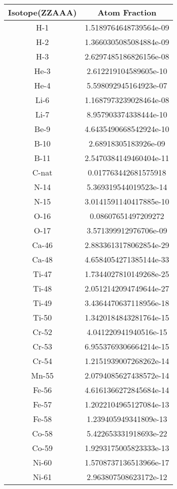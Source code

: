 \begin{table}[h!]
\centering
\begin{tabular}{|| c || c |}
\hline
Isotope(ZZAAA) & Atom Fraction \\
\hline \hline

H-1 &  1.5189764648739564e-09 \\
H-2 &  1.3660305085084884e-09 \\
H-3 &  2.6297485186826156e-08 \\
He-3 &  2.612219104589605e-10 \\
He-4 &  5.598092945164923e-07 \\
Li-6 &  1.1687973239028464e-08 \\
Li-7 &  8.957903374338444e-10 \\
Be-9 &  4.6435490668542924e-10 \\
B-10 &  2.68918305183926e-09 \\
B-11 &  2.5470384149460404e-11 \\
C-nat &  0.017763442681575918 \\
N-14 &  5.369319544019523e-14 \\
N-15 &  3.0141591140417885e-10 \\
O-16 &  0.08607651497209272 \\
O-17 &  3.571399912976706e-09 \\
Ca-46 &  2.8833613178062854e-29 \\
Ca-48 &  4.6584054271385144e-33 \\
Ti-47 &  1.7344027810149268e-25 \\
Ti-48 &  2.0512142094749644e-27 \\
Ti-49 &  3.4364470637118956e-18 \\
Ti-50 &  1.3420184843281764e-15 \\
Cr-52 &  4.041220941940516e-15 \\
Cr-53 &  6.9553769306664214e-15 \\
Cr-54 &  1.2151939007268262e-14 \\
Mn-55 &  2.0794085627438572e-14 \\
Fe-56 &  4.6161366272845684e-14 \\
Fe-57 &  1.2022104965127084e-13 \\
Fe-58 &  1.239405949341809e-13 \\
Co-58 &  5.422653331918693e-22 \\
Co-59 &  1.9293175005823333e-13 \\
Ni-60 &  1.5708737136513966e-17 \\
Ni-61 &  2.963807508623172e-12 \\

\end{tabular}
\end{table}

